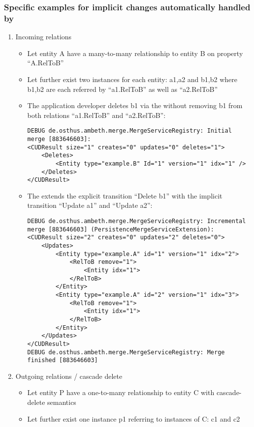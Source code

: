 \subsubsection{Specific examples for implicit changes automatically handled by \AMBETH{}}
\begin{enumerate}
	\item Incoming relations
		\begin{itemize}
			\item Let entity A have a many-to-many relationship to entity B on property ``A.RelToB''
			\item Let further exist two instances for each entity: a1,a2 and b1,b2 where b1,b2 are each referred by ``a1.RelToB'' as well as ``a2.RelToB''
			\item The application developer deletes b1 via the \AMBETH{}  without removing b1 from both relations ``a1.RelToB'' and ``a2.RelToB'':
\begin{lstlisting}[style=POM]
DEBUG de.osthus.ambeth.merge.MergeServiceRegistry: Initial merge [883646603]:
<CUDResult size="1" creates="0" updates="0" deletes="1">
	<Deletes>
		<Entity type="example.B" Id="1" version="1" idx="1" />
	</Deletes>
</CUDResult>
\end{lstlisting}
			\item The  extends the explicit transition ``Delete b1'' with the implicit transition ``Update a1'' and ``Update a2'':
\begin{lstlisting}[style=POM]		
DEBUG de.osthus.ambeth.merge.MergeServiceRegistry: Incremental merge [883646603] (PersistenceMergeServiceExtension):
<CUDResult size="2" creates="0" updates="2" deletes="0">
	<Updates>
		<Entity type="example.A" id="1" version="1" idx="2">
			<RelToB remove="1">
				<Entity idx="1">
			</RelToB>
		</Entity>
		<Entity type="example.A" id="2" version="1" idx="3">
			<RelToB remove="1">
				<Entity idx="1">
			</RelToB>
		</Entity>
	</Updates>
</CUDResult>
DEBUG de.osthus.ambeth.merge.MergeServiceRegistry: Merge finished [883646603]
\end{lstlisting}
		\end{itemize}
	\item Outgoing relations / cascade delete
		\begin{itemize}
			\item	Let entity P have a one-to-many relationship to entity C with cascade-delete semantics
			\item Let further exist one instance p1 referring to instances of C: c1 and c2

\end{itemize}
\end{enumerate}
